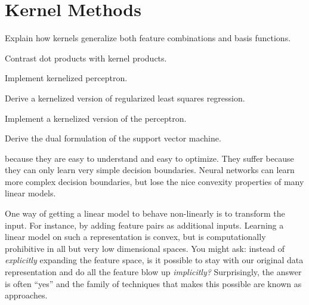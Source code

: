 \chapter{Kernel Methods} \label{sec:kernel}


\begin{learningobjectives}
\item Explain how kernels generalize both feature combinations and
  basis functions.
\item Contrast dot products with kernel products.
\item Implement kernelized perceptron.
\item Derive a kernelized version of regularized least squares
  regression.
\item Implement a kernelized version of the perceptron.
\item Derive the dual formulation of the support vector machine.
\end{learningobjectives}

\dependencies{}

 because they are easy to
understand and easy to optimize.  They suffer because they can only
learn very simple decision boundaries.  Neural networks can learn more
complex decision boundaries, but lose the nice convexity properties of
many linear models.

One way of getting a linear model to behave non-linearly is to
transform the input.  For instance, by adding feature pairs as
additional inputs.  Learning a linear model on such a representation
is convex, but is computationally prohibitive in all but very low
dimensional spaces.  You might ask: instead of \emph{explicitly}
expanding the feature space, is it possible to stay with our original
data representation and do all the feature blow up \emph{implicitly?}
Surprisingly, the answer is often ``yes'' and the family of techniques
that makes this possible are known as  approaches.

\begin{comment}
   - From feature combinations and basis functions to kernels
   - Dot products versus kernels
   - Kernel/dual perceptron
   - Support vector machines
\end{comment}

